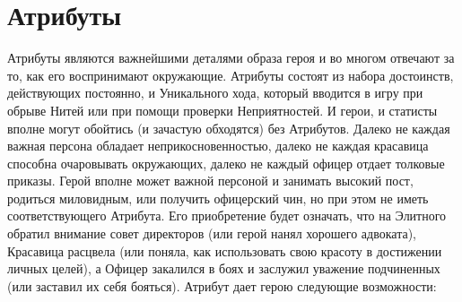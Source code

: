 \section{Атрибуты}
Атрибуты являются важнейшими деталями образа героя и во многом отвечают за то, как его воспринимают окружающие. Атрибуты состоят из набора достоинств, действующих постоянно, и Уникального хода, который вводится в игру при обрыве Нитей или при помощи проверки Неприятностей.
И герои, и статисты вполне могут обойтись (и зачастую обходятся) без Атрибутов. Далеко не каждая важная персона обладает неприкосновенностью, далеко не каждая красавица способна очаровывать окружающих, далеко не каждый офицер отдает толковые приказы. Герой вполне может важной персоной и занимать высокий пост, родиться миловидным, или получить офицерский чин, но при этом не иметь соответствующего Атрибута. Его приобретение будет означать, что на Элитного обратил внимание совет директоров (или герой нанял хорошего адвоката), Красавица расцвела (или поняла, как использовать свою красоту в достижении личных целей), а Офицер закалился в боях и заслужил уважение подчиненных (или заставил их себя бояться).
Атрибут дает герою следующие возможности:
